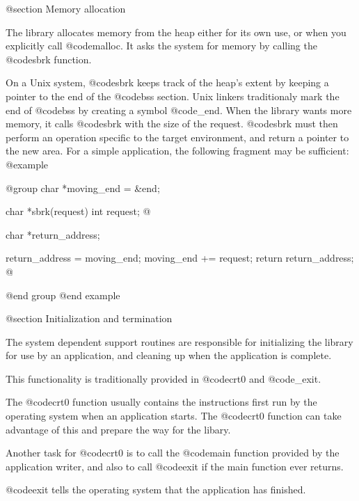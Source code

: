 @section Memory allocation

The library allocates memory from the heap either for its own use, or when
you explicitly call @code{malloc}.  It asks the system for
memory by calling the @code{sbrk} function.

On a Unix system, @code{sbrk} keeps track of the heap's extent by keeping a
pointer to the end of the @code{bss} section.  Unix linkers
traditionaly mark the end of @code{bss} by creating a symbol
@code{_end}.  When the library wants more memory, it calls
@code{sbrk} with the size of the request.  @code{sbrk} must then
perform an operation specific to the target environment, and return a pointer
to the new area.  For a simple application, the following fragment may
be sufficient:
@example

@group
char *moving_end = &end;

char *sbrk(request)
int request;
@{
  char *return_address;

  return_address = moving_end;
  moving_end += request;
  return return_address;
@}
@end group
@end example

@section Initialization and termination

The system dependent support routines are responsible for
initializing the library for use by an application, and cleaning up
when the application is complete.

This functionality is traditionally provided in @code{crt0} and
@code{_exit}.

The @code{crt0} function usually contains the instructions first run
by the operating system when an application starts.  The
@code{crt0} function can take advantage of this and prepare the way
for the libary.

Another task for @code{crt0} is to call the @code{main} function
provided by the application writer, and also to call @code{exit} if
the main function ever returns.

@code{exit} tells the operating system that the application has
finished.



